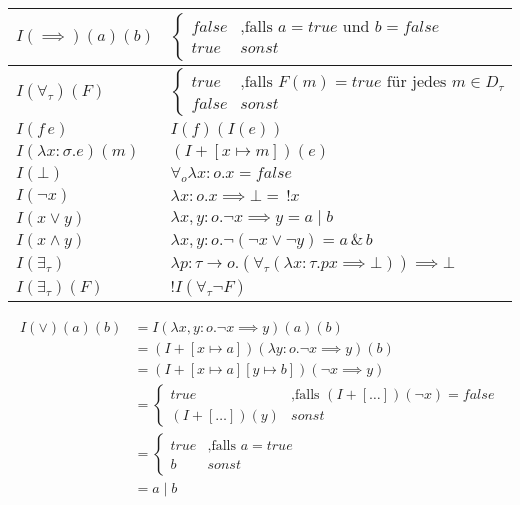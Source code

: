 \documentclass{scrartcl}
\begin{document}
\renewcommand{\arraystretch}{2}
\begin{tabular}{l|l}
	$ I(\implies)(a)(b) $ & $ \begin{cases}
		false & \text{,falls } a = true \text{ und } b = false \\
		true & sonst
	\end{cases} $ \\ 
	\hline 
	$ I(\forall_\tau)(F) $ & $ \begin{cases}
		true & \text{,falls } F(m) = true \text{ für jedes } m \in D_\tau \\
		false & sonst
	\end{cases} $ \\ 
	\hline 
	$ I(f \, e) $ & $ I(f)(I(e)) $ \\ 
	\hline 
	$ I(\lambda x : \sigma .e)(m) $ & $ (I + [x \mapsto m])(e) $ \\ 
	\hline 
	$ I(\bot) $ & $ \forall_o \lambda x : o.x = false $ \\ 
	\hline 
	$ I(\neg x) $ & $ \lambda x : o.x \implies \bot = \, !x $ \\ 
	\hline 
	$ I(x \vee y) $ & $ \lambda x,y : o. \neg x \implies y = a \mid b $  \\ 
	\hline 
	$ I(x \wedge y) $ & $ \lambda x,y : o. \neg(\neg x \vee \neg y) = a \, \& \, b $  \\ 
	\hline
	$ I(\exists_\tau) $ & $ \lambda p : \tau \rightarrow o.(\forall_\tau(\lambda x : \tau .px \implies \bot)) \implies \bot $ \\
	\hline
	$ I(\exists_\tau)(F) $ & $ !I(\forall_\tau \neg F) $
\end{tabular}

\begin{align*}
	I(\vee)(a)(b) &= I(\lambda x,y : o. \neg x \implies y)(a)(b) \\
	&= (I + [x \mapsto a])(\lambda y : o. \neg x \implies y)(b) \\
	&= (I + [x \mapsto a][y \mapsto b])(\neg x \implies y) \\
	&= \begin{cases}
		true & \text{,falls } (I + [\ldots])(\neg x) = false \\
		(I + [\ldots])(y) & sonst
	\end{cases} \\
	&= \begin{cases}
		true & \text{,falls } a = true \\
		b & sonst
	\end{cases} \\
	&= a \mid b
\end{align*}
\end{document}
